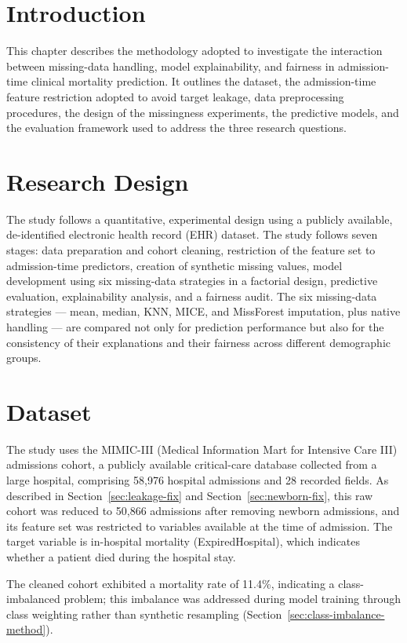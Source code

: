 \documentclass[12pt,a4paper]{report}
\begin{document}
\section{Introduction}
This chapter describes the methodology adopted to investigate the interaction between missing-data handling, model explainability, and fairness in admission-time clinical mortality prediction. It outlines the dataset, the admission-time feature restriction adopted to avoid target leakage, data preprocessing procedures, the design of the missingness experiments, the predictive models, and the evaluation framework used to address the three research questions.


\section{Research Design}
The study follows a quantitative, experimental design using a publicly available, de-identified electronic health record (EHR) dataset. The study follows seven stages: data preparation and cohort cleaning, restriction of the feature set to admission-time predictors, creation of synthetic missing values, model development using six missing-data strategies in a factorial design, predictive evaluation, explainability analysis, and a fairness audit. The six missing-data strategies --- mean, median, KNN, MICE, and MissForest imputation, plus native handling --- are compared not only for prediction performance but also for the consistency of their explanations and their fairness across different demographic groups.


\section{Dataset}
The study uses the MIMIC-III (Medical Information Mart for Intensive Care III) admissions cohort, a publicly available critical-care database collected from a large hospital, comprising 58,976 hospital admissions and 28 recorded fields. As described in Section~\ref{sec:leakage-fix} and Section~\ref{sec:newborn-fix}, this raw cohort was reduced to 50,866 admissions after removing newborn admissions, and its feature set was restricted to variables available at the time of admission. The target variable is in-hospital mortality (ExpiredHospital), which indicates whether a patient died during the hospital stay.

The cleaned cohort exhibited a mortality rate of 11.4\%, indicating a class-imbalanced problem; this imbalance was addressed during model training through class weighting rather than synthetic resampling (Section~\ref{sec:class-imbalance-method}).
\end{document}
